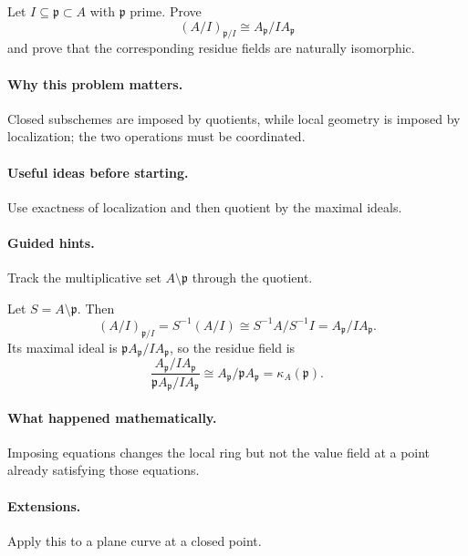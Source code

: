 \begin{problem}
Let $I\subseteq\mathfrak p\subset A$ with $\mathfrak p$ prime.  Prove
\[
(A/I)_{\mathfrak p/I}\cong A_{\mathfrak p}/IA_{\mathfrak p}
\]
and prove that the corresponding residue fields are naturally isomorphic.
\end{problem}

\paragraph{Why this problem matters.}
Closed subschemes are imposed by quotients, while local geometry is imposed by localization; the two operations must be coordinated.

\paragraph{Useful ideas before starting.}
Use exactness of localization and then quotient by the maximal ideals.

\paragraph{Guided hints.}
Track the multiplicative set $A\setminus\mathfrak p$ through the quotient.

\begin{solution}
Let $S=A\setminus\mathfrak p$.  Then
\[
(A/I)_{\mathfrak p/I}=S^{-1}(A/I)
\cong S^{-1}A/S^{-1}I
=A_{\mathfrak p}/IA_{\mathfrak p}.
\]
Its maximal ideal is $\mathfrak pA_{\mathfrak p}/IA_{\mathfrak p}$, so the residue field is
\[
\frac{A_{\mathfrak p}/IA_{\mathfrak p}}
{\mathfrak pA_{\mathfrak p}/IA_{\mathfrak p}}
\cong
A_{\mathfrak p}/\mathfrak pA_{\mathfrak p}
=\kappa_A(\mathfrak p).
\]
\end{solution}

\paragraph{What happened mathematically.}
Imposing equations changes the local ring but not the value field at a point already satisfying those equations.

\paragraph{Extensions.}
Apply this to a plane curve at a closed point.
